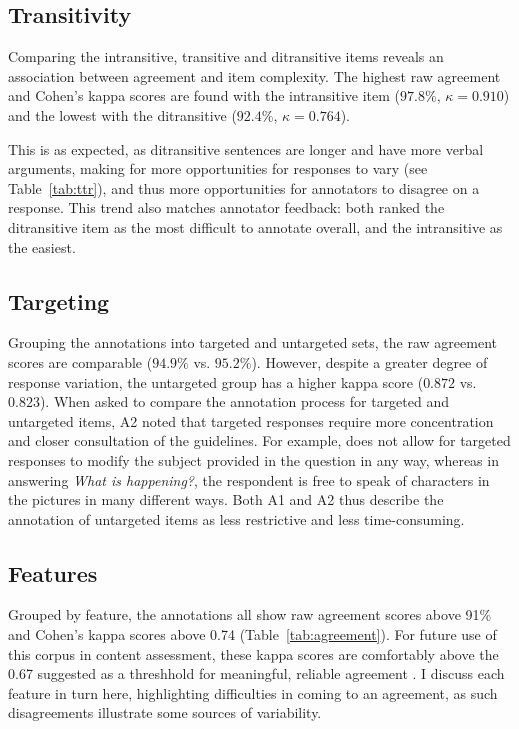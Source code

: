 \subsection{Transitivity} 
\label{sec:transitivity}
Comparing the intransitive, transitive and ditransitive items reveals an association between agreement and item complexity. The highest raw agreement and Cohen's kappa scores are found with the intransitive item ($97.8\%$, $\kappa=0.910$) and the lowest with the ditransitive ($92.4\%$, $\kappa=0.764$). 

This is as expected, as ditransitive sentences are longer and have more verbal arguments, making for more opportunities for responses to vary (see Table~\ref{tab:ttr}), and thus more opportunities for annotators to disagree on a response. This trend also matches annotator feedback: both ranked the ditransitive item as the most difficult to annotate overall, and the intransitive as the easiest.

\subsection{Targeting} 
\label{sec:prompts}
Grouping the annotations into targeted and untargeted sets, the raw agreement scores are comparable ($94.9\%$ vs. $95.2\%$). However, despite a greater degree of response variation, the untargeted group has a higher kappa score ($0.872$ vs. $0.823$).
%
%
When asked to compare the annotation process for targeted and untargeted items, A2 noted that targeted responses require more concentration and closer consultation of the guidelines. For example,  does not allow for targeted responses to modify the subject provided in the question in any way, whereas in answering \textit{What is happening?}, the respondent is free to speak of characters in the pictures in many different ways.  Both A1 and A2 thus describe the annotation of untargeted items as less restrictive and less time-consuming.

\subsection{Features} 
\label{sec:features}
Grouped by feature, the annotations all show raw agreement scores above 91\% and Cohen's kappa scores above 0.74 (Table~\ref{tab:agreement}). For future use of this corpus in content assessment, these kappa scores are comfortably above the 0.67 suggested as a threshhold for meaningful, reliable agreement \citep{landis1977measurement, artstein:massimo:2008}.  I discuss each feature in turn here, highlighting difficulties in coming to an agreement, as such disagreements illustrate some sources of variability.

